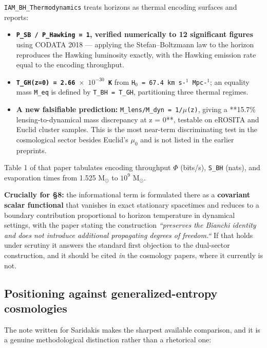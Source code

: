 \documentclass[12pt,a4paper]{article}
\begin{document}
\texttt{IAM\_BH\_Thermodynamics} treats horizons as thermal encoding surfaces and reports:


\begin{itemize}\setlength\itemsep{2pt}
  \item \textbf{\texttt{P\_SB / P\_Hawking = 1}, verified numerically to 12 significant figures} using CODATA 2018 --- applying the Stefan--Boltzmann law to the horizon reproduces the Hawking luminosity exactly, with the Hawking emission rate equal to the encoding throughput.
  \item \textbf{\texttt{T\_GH(z=0) = 2.66 $\times$ $10^{-30}$ K}} from \texttt{H$_{0}$ = 67.4 km s-$^{1}$ Mpc-$^{1}$}; an equality mass \texttt{M\_eq} is defined by \texttt{T\_BH = T\_GH}, partitioning three thermal regimes.
  \item \textbf{A new falsifiable prediction:} \texttt{M\_lens/M\_dyn = 1/$\mu$(z)}, giving a **15.7\% lensing-to-dynamical mass discrepancy at z = 0**, testable on eROSITA and Euclid cluster samples. This is the most near-term discriminating test in the cosmological sector besides Euclid's \texttt{$\mu_{0}$} and is not listed in the earlier preprints.
\end{itemize}


Table 1 of that paper tabulates encoding throughput \texttt{$\Phi$} (bits/s), \texttt{S\_BH} (nats), and evaporation times from 1.525 M$_{\odot}$ to $10^{9}$ M$_{\odot}$.


\textbf{Crucially for \S8:} the informational term is formulated there as a \textbf{covariant scalar functional} that vanishes in exact stationary spacetimes and reduces to a boundary contribution proportional to horizon temperature in dynamical settings, with the paper stating the construction \textit{``preserves the Bianchi identity and does not introduce additional propagating degrees of freedom.``} If that holds under scrutiny it answers the standard first objection to the dual-sector construction, and it should be cited \textit{in} the cosmology papers, where it currently is not.





\subsection{Positioning against generalized-entropy cosmologies}

The note written for Saridakis makes the sharpest available comparison, and it is a genuine methodological distinction rather than a rhetorical one:
\end{document}
